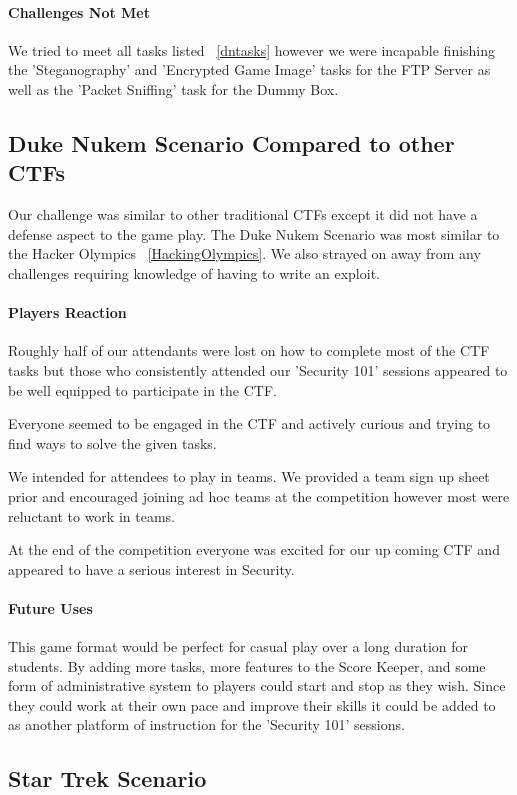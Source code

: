 \documentclass[10pt]{article}
\begin{document}
\paragraph*{Challenges Not Met}
We tried to meet all tasks listed ~\ref{dntasks} however we were incapable finishing
the 'Steganography' and 'Encrypted Game Image' tasks for the FTP Server as well as
the 'Packet Sniffing' task for the Dummy Box.

\subsection{Duke Nukem Scenario Compared to other CTFs}
Our challenge was similar to other traditional CTFs except it did not have a defense
aspect to the game play. The Duke Nukem Scenario was most similar to the Hacker Olympics 
~\ref{HackingOlympics}. We also strayed on away from any challenges requiring knowledge
of having to write an exploit.

\paragraph*{Players Reaction}
Roughly half of our attendants were lost on how to complete most of the CTF tasks but those
who consistently attended our 'Security 101' sessions appeared to be well equipped
to participate in the CTF.

Everyone seemed to be engaged in the CTF and actively curious and trying to find 
ways to solve the given tasks.

We intended for attendees to play in teams. We provided a team sign up sheet prior
and encouraged joining ad hoc teams at the competition however most were reluctant to work 
in teams. 

At the end of the competition everyone was excited for our up coming CTF and appeared to
have a serious interest in Security.

\paragraph*{Future Uses}
This game format would be perfect for casual play over a long duration for students. 
By adding more tasks, more features to the Score Keeper, and some form of administrative
system to players could start and stop as they wish. Since they could work at their own pace 
and improve their skills it could be added to as another platform of instruction
for the 'Security 101' sessions. 

\subsection{Star Trek Scenario}
\end{document}

